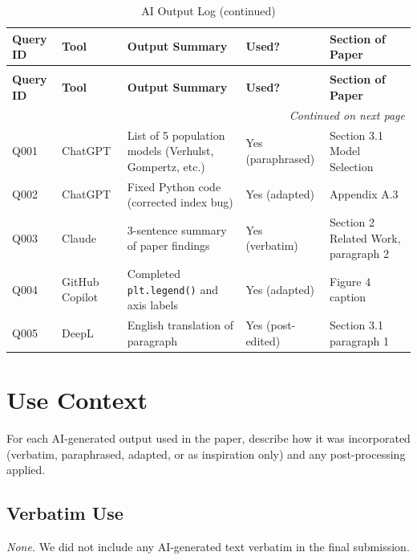 \documentclass[12pt, a4paper]{article}
\begin{document}
\begin{longtable}{p{1.5cm} p{2cm} p{3.5cm} p{3.5cm} p{4cm}}
\caption{AI Output Log} \\
\toprule
\textbf{Query ID} & \textbf{Tool} & \textbf{Output Summary} & \textbf{Used?} & \textbf{Section of Paper} \\
\midrule
\endfirsthead

\caption[]{AI Output Log (continued)} \\
\toprule
\textbf{Query ID} & \textbf{Tool} & \textbf{Output Summary} & \textbf{Used?} & \textbf{Section of Paper} \\
\midrule
\endhead

\midrule
\multicolumn{5}{r}{\textit{Continued on next page}} \\
\endfoot

\bottomrule
\endlastfoot

Q001 & ChatGPT & List of 5 population models (Verhulst, Gompertz, etc.) & Yes (paraphrased) & Section 3.1 Model Selection \\
Q002 & ChatGPT & Fixed Python code (corrected index bug) & Yes (adapted) & Appendix A.3 \\
Q003 & Claude & 3-sentence summary of paper findings & Yes (verbatim) & Section 2 Related Work, paragraph 2 \\
Q004 & GitHub Copilot & Completed \texttt{plt.legend()} and axis labels & Yes (adapted) & Figure 4 caption \\
Q005 & DeepL & English translation of paragraph & Yes (post-edited) & Section 3.1 paragraph 1 \\

\end{longtable}

\section{Use Context}

For each AI-generated output used in the paper, describe how it was
incorporated (verbatim, paraphrased, adapted, or as inspiration only)
and any post-processing applied.

\subsection{Verbatim Use}
\textit{None.} We did not include any AI-generated text verbatim in
the final submission.
\end{document}
